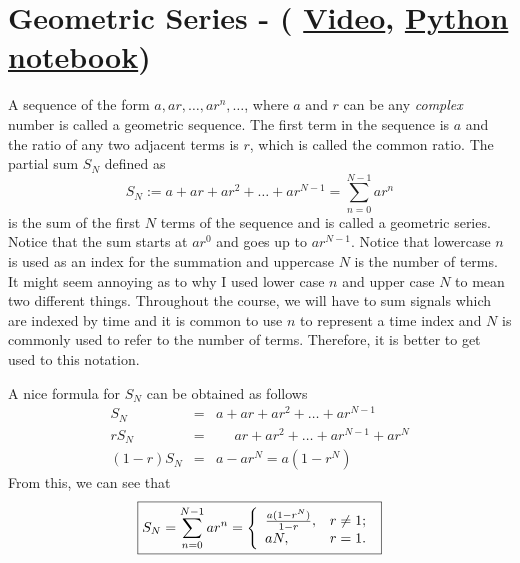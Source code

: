 \chapter{Geometric Series  - (
\href{https://youtu.be/PorDnSVfcqc}{Video},
\href{https://colab.research.google.com/drive/1iO7-QiDYePlRxaFbWY-plFB2ibVZd8rP?usp=sharing}{Python notebook})}

A sequence of the form $a, a r, \ldots, a r^{n},\ldots $, where $a$ and $r$ can be
 any {\em complex} number is called a geometric sequence.
 The first term in the sequence is $a$  and the ratio of any two adjacent terms is $r$, which is called the common ratio.
 The partial sum $S_N$ defined as
\[
S_N := a + a r + a r^2 + \ldots + a r^{N-1} = \sum_{n=0}^{N-1} a r^{n}
\]
is the sum of the first $N$ terms of the sequence and is called a geometric series.
Notice that the sum starts at $ar^0$ and goes up to $a r^{N-1}$.
Notice that lowercase $n$ is used as an index for the summation and uppercase $N$ is the number of terms.
It might seem annoying as to why I used lower case $n$ and upper case $N$ to mean two different things.
Throughout the course, we will have to sum signals which are indexed by time and it is common to use $n$ to represent a time index
and $N$ is commonly used to refer to the number of terms.
Therefore, it is better to get used to this notation.

A nice formula for $S_N$ can be obtained as follows
\begin{eqnarray}
S_N  & = & a + a r + a r^2 + \ldots + a r^{N-1}  \\
r S_N & = & \ \ \ \ \ \ a r + a r^2 + \ldots + a r^{N-1} + a r^N \\
(1-r)S_N & = & a - a r^N = a (1-r^N)
\end{eqnarray}
From this, we can see that
\begin{equation}
\label{eqn:sumtontermsgm}
\boxed{
S_N = \sum_{n=0}^{N-1} a r^n = \left\{
                       \begin{array}{ll}
                        \frac{a(1-r^{N})}{1-r}, & \hbox{$r \neq 1$;} \\
                        a N, & \hbox{$r = 1$.}
                       \end{array}
                     \right.\\
}
\end{equation}

